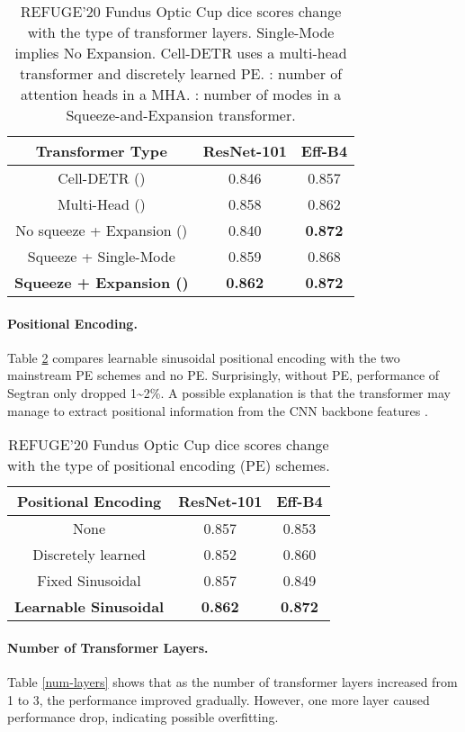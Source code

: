 \documentclass{article}
\begin{document}
\begin{table}[h]
\begin{centering}\setlength\tabcolsep{3pt}
\begin{tabular}{|c|c|c|}
\hline 
Transformer Type & ResNet-101 & Eff-B4 \tabularnewline
\hline 
Cell-DETR () &  0.846 & 0.857 \tabularnewline
\hline 
Multi-Head () &  0.858 & 0.862 \tabularnewline
\hline 
No squeeze + Expansion () &  0.840 & \textbf{0.872} \tabularnewline
\hline 
Squeeze + Single-Mode &  0.859 & 0.868 \tabularnewline
\hline
\textbf{Squeeze + Expansion ()} &  \textbf{0.862} & \textbf{0.872} \tabularnewline
\hline 
\end{tabular}
\caption{REFUGE'20 Fundus Optic Cup dice scores change with the type of transformer layers. Single-Mode implies No Expansion. Cell-DETR uses a multi-head transformer and discretely learned PE. : number of attention heads in a MHA. : number of modes in a Squeeze-and-Expansion transformer. }
\label{layer-scheme}
\par\end{centering}
\end{table}

\paragraph{Positional Encoding.}
Table \ref{pos-scheme} compares learnable sinusoidal positional encoding with the two mainstream PE schemes and no PE. Surprisingly, without PE, performance of Segtran only dropped 1\textasciitilde 2\%. A possible explanation is that the transformer may manage to extract positional information from the CNN backbone features \cite{cnn-pos}.
\begin{table}[h]
\begin{centering}
\begin{tabular}{|c|c|c|}
\hline 
Positional Encoding & ResNet-101 & Eff-B4 \tabularnewline
\hline 
None & 0.857  & 0.853 
\tabularnewline
\hline 
Discretely learned & 0.852 & 0.860 \tabularnewline
\hline 
Fixed Sinusoidal & 0.857  & 0.849 \tabularnewline
\hline
\textbf{Learnable Sinusoidal} &  \textbf{0.862} & \textbf{0.872} \tabularnewline
\hline 
\end{tabular}
\caption{REFUGE'20 Fundus Optic Cup dice scores change with the type of positional encoding (PE) schemes.}
\label{pos-scheme}
\par\end{centering}
\end{table}

\paragraph{Number of Transformer Layers.} 
Table \ref{num-layers} shows that as the number of transformer layers increased from 1 to 3, the performance improved gradually. However, one more layer caused performance drop, indicating possible overfitting.
\end{document}

